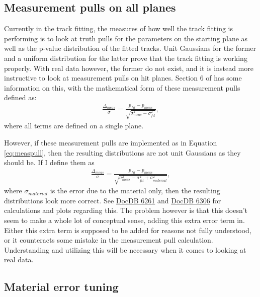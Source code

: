 	\subsection{Measurement pulls on all planes}

		Currently in the track fitting, the measures of how well the track fitting is performing is to look at truth pulls for the parameters on the starting plane as well as the p-value distribution of the fitted tracks. Unit Gaussians for the former and a uniform distribution for the latter prove that the track fitting is working properly. With real data however, the former do not exist, and it is instead more instructive to look at measurement pulls on hit planes. Section 6 of \cite{trajfit} has some information on this, with the mathematical form of these measurement pulls defined as:
		\begin{align} \label{eq:measpull}
            \frac{\Delta_{meas}}{\sigma} = \frac{p_{fit} - p_{meas}}{\sqrt{\sigma^{2}_{meas} - \sigma^{2}_{fit}}},
        \end{align}
        where all terms are defined on a single plane.

        However, if these measurement pulls are implemented as in Equation \ref{eq:measpull}, then the resulting distributions are not unit Gaussians as they should be. If I define them as 
        \begin{align} \label{eq:measpullmaterial}
            \frac{\Delta_{meas}}{\sigma} = \frac{p_{fit} - p_{meas}}{\sqrt{\sigma^{2}_{meas} - \sigma^{2}_{fit} + \sigma^{2}_{material}}},
        \end{align}
        where $\sigma_{material}$ is the error due to the material only, then the resulting distributions look more correct. See \href{https://gm2-docdb.fnal.gov/cgi-bin/private/ShowDocument?docid=6261}{DocDB 6261} and \href{https://gm2-docdb.fnal.gov/cgi-bin/private/ShowDocument?docid=6306}{DocDB 6306} for calculations and plots regarding this. The problem however is that this doesn't seem to make a whole lot of conceptual sense, adding this extra error term in. Either this extra term is supposed to be added for reasons not fully understood, or it counteracts some mistake in the measurement pull calculation. Understanding and utilizing this will be necessary when it comes to looking at real data.

	\subsection{Material error tuning}

